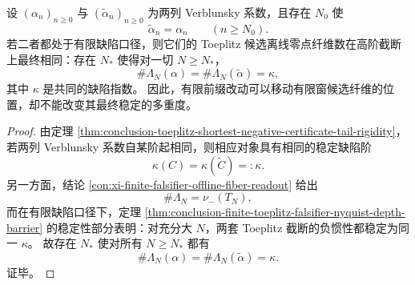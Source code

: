\begin{proposition}[候选离线零点纤维数的尾不变量性]\label{prop:conclusion-offline-fiber-count-tail-invariance}
设 \((\alpha_n)_{n\ge 0}\) 与 \((\widetilde\alpha_n)_{n\ge 0}\) 为两列 Verblunsky 系数，且存在 \(N_0\) 使
\[
\widetilde\alpha_n=\alpha_n\qquad(n\ge N_0).
\]
若二者都处于有限缺陷口径，则它们的 Toeplitz 候选离线零点纤维数在高阶截断上最终相同：存在 \(N_\ast\) 使得对一切 \(N\ge N_\ast\)，
\[
\#\Lambda_N(\alpha)=\#\Lambda_N(\widetilde\alpha)=\kappa,
\]
其中 \(\kappa\) 是共同的缺陷指数。
因此，有限前缀改动可以移动有限窗候选纤维的位置，却不能改变其最终稳定的多重度。
\end{proposition}
\begin{proof}
由定理 \ref{thm:conclusion-toeplitz-shortest-negative-certificate-tail-rigidity}，若两列 Verblunsky 系数自某阶起相同，则相应对象具有相同的稳定缺陷阶
\[
\kappa(C)=\kappa(\widetilde C)=:\kappa.
\]
另一方面，结论 \ref{con:xi-finite-falsifier-offline-fiber-readout} 给出
\[
\#\Lambda_N=\nu_-(T_N),
\]
而在有限缺陷口径下，定理 \ref{thm:conclusion-finite-toeplitz-falsifier-nyquist-depth-barrier} 的稳定性部分表明：对充分大 \(N\)，两套 Toeplitz 截断的负惯性都稳定为同一 \(\kappa\)。
故存在 \(N_\ast\) 使对所有 \(N\ge N_\ast\) 都有
\[
\#\Lambda_N(\alpha)=\#\Lambda_N(\widetilde\alpha)=\kappa.
\]
证毕。
\end{proof}
